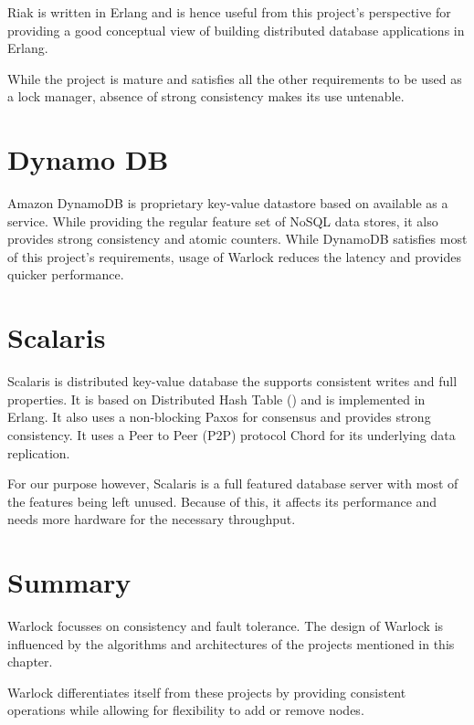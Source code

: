 Riak is written in Erlang and is hence useful from this project's perspective
for providing a good conceptual view of building distributed database
applications in Erlang.

While the project is mature and satisfies all
the other requirements to be used as a lock manager, absence of strong
consistency makes its use untenable.

\section{Dynamo DB}

Amazon DynamoDB \citep{dynamoDB} is proprietary key-value datastore based on
\citet{DeCandia07} available as a service. While providing the regular
feature set of NoSQL data stores, it also provides strong consistency and
atomic counters. While DynamoDB satisfies most of this project's requirements,
usage of Warlock reduces the latency and provides quicker performance.

\section{Scalaris}

Scalaris \citep{scalaris} is distributed key-value database the supports
consistent writes and full  properties. It is based on Distributed
Hash Table ()%
and is implemented in Erlang. It also uses a non-blocking Paxos for consensus
and provides strong consistency. It uses a Peer to Peer (P2P) protocol \dash{}
Chord \citep{StoicaMKKB01} for its underlying data replication.

For our purpose however, Scalaris is a full featured database server with most
of the features being left unused. Because of this, it affects its performance
and needs more hardware for the necessary throughput.

\section{Summary}

Warlock focusses on consistency and fault tolerance. The design of Warlock is
influenced by the algorithms and architectures of the projects mentioned in
this chapter.

Warlock differentiates itself from these projects by providing consistent
operations while allowing for flexibility to add or remove nodes.
